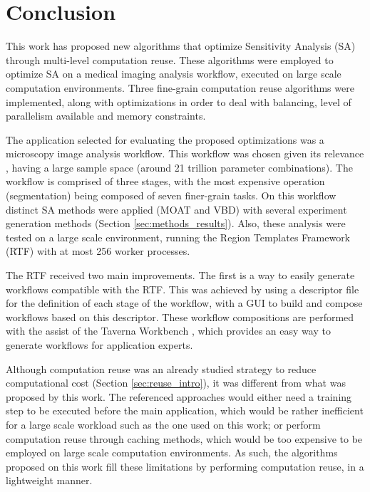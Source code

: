 \section{Conclusion}

This work has proposed new algorithms that optimize Sensitivity Analysis (SA) through multi-level computation reuse. These algorithms were employed to optimize SA on a medical imaging analysis workflow, executed on large scale computation environments. Three fine-grain computation reuse algorithms were implemented, along with optimizations in order to deal with balancing, level of parallelism available and memory constraints.

The application selected for evaluating the proposed optimizations was a microscopy image analysis workflow. This workflow was chosen given its relevance \cite{rtf1,rtf2,DBLP:journals/bmcbi/KurcQWWTCNLSF15,DBLP:journals/ijhpca/SaltzTPCKKK13}, having a large sample space (around 21 trillion parameter combinations). The workflow is comprised of three stages, with the most expensive operation (segmentation) being composed of seven finer-grain tasks. On this workflow distinct SA methods were applied (MOAT and VBD) with several experiment generation methods (Section \ref{sec:methods_results}). Also, these analysis were tested on a large scale environment, running the Region Templates Framework (RTF) with at most 256 worker processes.

The RTF received two main improvements. The first is a way to easily generate workflows compatible with the RTF. This was achieved by using a descriptor file for the definition of each stage of the workflow, with a GUI to build and compose workflows based on this descriptor. These workflow compositions are performed with the assist of the Taverna Workbench \cite{taverna}, which provides an easy way to generate workflows for application experts.

Although computation reuse was an already studied strategy to reduce computational cost (Section \ref{sec:reuse_intro}), it was different from what was proposed by this work. The referenced approaches would either need a training step to be executed before the main application, which would be rather inefficient for a large scale workload such as the one used on this work; or perform computation reuse through caching methods, which would be too expensive to be employed on large scale computation environments. As such, the algorithms proposed on this work fill these limitations by performing computation reuse, in a lightweight manner.

